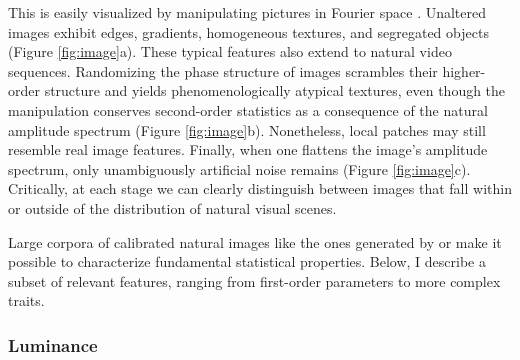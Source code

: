 This is easily visualized by manipulating pictures in Fourier space \citep{Hyvarinen:2009hf}. Unaltered images exhibit edges, gradients, homogeneous textures, and segregated objects (Figure \ref{fig:image}a). These typical features also extend to natural video sequences. Randomizing the phase structure of images scrambles their higher-order structure and yields phenomenologically atypical textures, even though the manipulation conserves second-order statistics as a consequence of the natural amplitude spectrum (Figure \ref{fig:image}b). Nonetheless, local patches may still resemble real image features. Finally, when one flattens the image's amplitude spectrum, only unambiguously artificial noise remains (Figure \ref{fig:image}c). Critically, at each stage we can clearly distinguish between images that fall within or outside of the distribution of natural visual scenes.

Large corpora of calibrated natural images like the ones generated by \citet{vanHateren:1998jt} or \citet{Tkacik:2011aa} make it possible to characterize fundamental statistical properties. Below, I describe a subset of relevant features, ranging from first-order parameters to more complex traits.

\subsubsection{Luminance}

